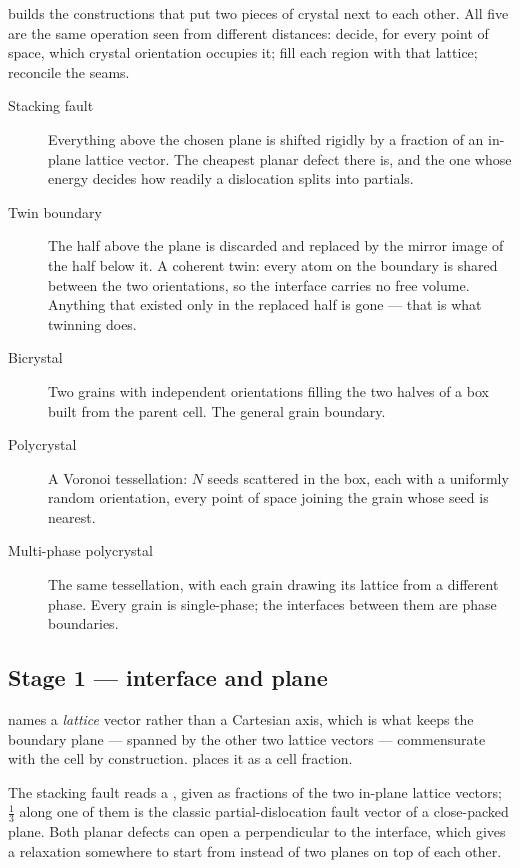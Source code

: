 \menusep{} builds the constructions that
put two pieces of crystal next to each other. All five are the same
operation seen from different distances: decide, for every point of space,
which crystal orientation occupies it; fill each region with that lattice;
reconcile the seams.

\begin{description}
  \item[Stacking fault] Everything above the chosen plane is shifted
    rigidly by a fraction of an in-plane lattice vector. The cheapest
    planar defect there is, and the one whose energy decides how readily a
    dislocation splits into partials.
  \item[Twin boundary] The half above the plane is discarded and replaced
    by the mirror image of the half below it. A coherent twin: every atom
    on the boundary is shared between the two orientations, so the
    interface carries no free volume. Anything that existed only in the
    replaced half is gone --- that is what twinning does.
  \item[Bicrystal] Two grains with independent orientations filling the
    two halves of a box built from the parent cell. The general grain
    boundary.
  \item[Polycrystal] A Voronoi tessellation: $N$ seeds scattered in the
    box, each with a uniformly random orientation, every point of space
    joining the grain whose seed is nearest.
  \item[Multi-phase polycrystal] The same tessellation, with each grain
    drawing its lattice from a different phase. Every grain is
    single-phase; the interfaces between them are phase boundaries.
\end{description}

\subsection{Stage 1 --- interface and plane}

 names a \emph{lattice} vector rather than a Cartesian
axis, which is what keeps the boundary plane --- spanned by the other two
lattice vectors --- commensurate with the cell by construction.
 places it as a cell fraction.

The stacking fault reads a , given as fractions of the
two in-plane lattice vectors; $\tfrac{1}{3}$ along one of them is the
classic partial-dislocation fault vector of a close-packed plane. Both
planar defects can open a  perpendicular to the
interface, which gives a relaxation somewhere to start from instead of two
planes on top of each other.

